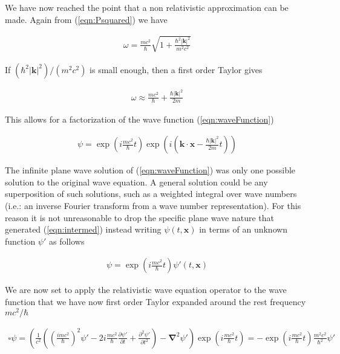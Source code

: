 \documentclass[]{eliblog}
\newcommand{\Abs}[1]{{\left\lvert{#1}\right\rvert}}
\newcommand{\Bk}[0]{\mathbf{k}}
\newcommand{\Bx}[0]{\mathbf{x}}
\newcommand{\spacegrad}[0]{\boldsymbol{\nabla}}
\newcommand{\delambertian}[0]{\square}
\begin{document}
We have now reached the point that a non relativistic approximation can be made.
Again from (\ref{eqn:Psquared}) we have

\begin{align}
\omega = \frac{m c^2}{\hbar} \sqrt{ 1 + \frac{\hbar^2 \Abs{\Bk}^2}{m^2 c^2}}
\end{align}

If $(\hbar^2 \Abs{\Bk}^2)/(m^2 c^2)$ is small enough, then a first order Taylor gives

\begin{align}
\omega \approx \frac{m c^2}{\hbar} + \frac{\hbar \Abs{\Bk}^2}{2 m}
\end{align}

This allows for a factorization of the wave function (\ref{eqn:waveFunction})

\begin{align}\label{eqn:intermed}
\psi = 
\exp\left( i \frac{m c^2}{\hbar} t \right) 
\exp\left( i \left( 
\Bk \cdot \Bx 
-\frac{\hbar \Abs{\Bk}^2}{2 m}t 
\right) \right)
\end{align}

The infinite plane wave solution of (\ref{eqn:waveFunction}) was only one possible solution to the original wave equation.
A general solution could be any superposition of such solutions, such as a weighted integral over wave numbers (i.e.: an 
inverse Fourier transform from a wave number representation).  For this reason it is not unreasonable to drop the specific plane wave nature that generated (\ref{eqn:intermed}) instead writing $\psi(t,\Bx)$ in terms of an unknown function $\psi'$ as follows

\begin{align}
\psi = \exp\left( i \frac{m c^2}{\hbar} t \right) \psi'(t, \Bx)
\end{align}

We are now set to apply the relativistic wave equation operator to the wave function that we have now first order Taylor expanded
around the rest frequency $m c^2/\hbar$

\begin{align}
\delambertian \psi 
= 
\left(
\frac{1}{c^2} 
\left( 
\left( \frac{i m c^2}{\hbar} \right)^2 \psi' - 2 i \frac{m c^2}{\hbar} \frac{\partial \psi'}{\partial t} + 
\frac{\partial^2 \psi'}{\partial t^2} 
\right) 
-
\spacegrad^2 \psi' 
\right)
\exp\left( i \frac{m c^2}{\hbar} t \right) 
= - 
\exp\left( i \frac{m c^2}{\hbar} t \right) 
\frac{m^2 c^2}{\hbar^2} \psi'
\end{align}
\end{document}

